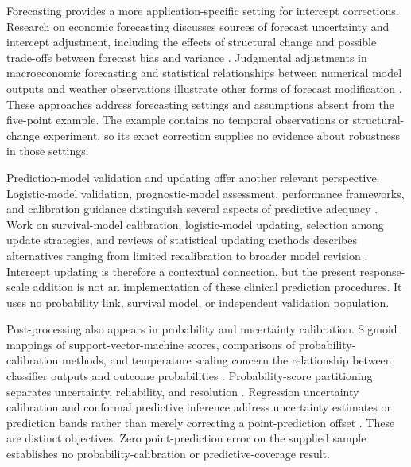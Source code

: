 \documentclass[11pt]{article}
\begin{document}
Forecasting provides a more application-specific setting for intercept corrections. Research on economic forecasting discusses sources of forecast uncertainty and intercept adjustment, including the effects of structural change and possible trade-offs between forecast bias and variance \cite{Clements1994TowardsTheory,Clements1996InterceptCorrections,Clements1998ForecastingEconomic}. Judgmental adjustments in macroeconomic forecasting and statistical relationships between numerical model outputs and weather observations illustrate other forms of forecast modification \cite{Turner1990RoleJudgement,Glahn1972UseModel}. These approaches address forecasting settings and assumptions absent from the five-point example. The example contains no temporal observations or structural-change experiment, so its exact correction supplies no evidence about robustness in those settings.

Prediction-model validation and updating offer another relevant perspective. Logistic-model validation, prognostic-model assessment, performance frameworks, and calibration guidance distinguish several aspects of predictive adequacy \cite{Miller1991ValidationTechniques,Harrell1996MultivariablePrognostic,Steyerberg2009AssessingPerformance,Initiative2019CalibrationAchilles}. Work on survival-model calibration, logistic-model updating, selection among update strategies, and reviews of statistical updating methods describes alternatives ranging from limited recalibration to broader model revision \cite{Houwelingen2000ValidationCalibration,Steyerberg2004ValidationUpdating,Vergouwe2016ClosedTesting,Su2016ReviewStatistical}. Intercept updating is therefore a contextual connection, but the present response-scale addition is not an implementation of these clinical prediction procedures. It uses no probability link, survival model, or independent validation population.

Post-processing also appears in probability and uncertainty calibration. Sigmoid mappings of support-vector-machine scores, comparisons of probability-calibration methods, and temperature scaling concern the relationship between classifier outputs and outcome probabilities \cite{Platt1999ProbabilisticOutputs,Niculescumizil2005PredictingGood,Guo2017CalibrationModern}. Probability-score partitioning separates uncertainty, reliability, and resolution \cite{Murphy1973NewVector}. Regression uncertainty calibration and conformal predictive inference address uncertainty estimates or prediction bands rather than merely correcting a point-prediction offset \cite{Kuleshov2018AccurateUncertainties,Levi2022EvaluatingCalibrating,Lei2018DistributionfreePredictive}. These are distinct objectives. Zero point-prediction error on the supplied sample establishes no probability-calibration or predictive-coverage result.
\end{document}
